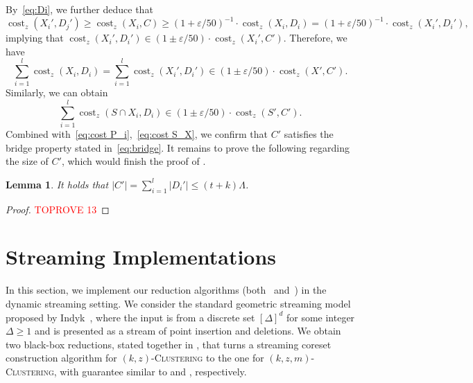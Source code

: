 \documentclass[letterpaper,11pt]{article}
\theoremstyle{plain}
\newtheorem{lemma}[theorem]{Lemma}
\theoremstyle{definition}
\theoremstyle{remark}
\DeclareMathOperator{\cost}{cost}
\newcommand{\eps}{\varepsilon}
\newcommand{\ProblemName}[1]{\textsc{#1}}
\newcommand{\kzC}{\ProblemName{$(k,z)$-Clustering}\xspace}
\newcommand{\kzmC}{\ProblemName{$(k,z,m)$-Clustering}\xspace}
\begin{document}
By~\eqref{eq:Di}, we further deduce that 
\begin{equation*}
\cost_z(X_i',D_j')\ge \cost_z(X_i,C)\ge (1+\eps/50)^{-1}\cdot \cost_z(X_i,D_i)= (1+\eps/50)^{-1}\cdot \cost_z(X_i',D_i'),
\end{equation*}
implying that $\cost_z(X_i',D_i')\in (1\pm\eps/50)\cdot \cost_z(X_i',C')$.
Therefore, we have 
\begin{equation*}
\sum_{i=1}^l\cost_z(X_i,D_i) = \sum_{i=1}^l\cost_z(X_i',D_i') \in (1\pm \eps/50)\cdot\cost_z(X',C').
\end{equation*}
Similarly, we can obtain 
\begin{equation*}
\sum_{i=1}^l\cost_z(S\cap X_i,D_i)\in (1\pm\eps/50)\cdot \cost_z(S',C').
\end{equation*}
Combined with~\eqref{eq:cost P_i},~\eqref{eq:cost S_X}, we confirm that $C'$ satisfies the bridge property stated in~\eqref{eq:bridge}. It remains to prove the following  regarding the size of $C'$, which would finish the proof of .
















\begin{lemma}
\label{claim:bounded C'}
It holds that
$|C'|=\sum_{i=1}^l |D_i'|\le (t+k)\Lambda$.
\end{lemma}
\begin{proof}\textcolor{red}{TOPROVE 13}\end{proof}
 


\section{Streaming Implementations}
\label{sec:streaming}

In this section, we implement our reduction algorithms (both~ and~) in the dynamic streaming setting. 
We consider the standard geometric streaming model proposed by Indyk~\cite{DBLP:conf/stoc/Indyk04},
where the input is from a discrete set $[\Delta]^d$ for some integer $\Delta \geq 1$ and is presented as a stream of point insertion and deletions.
We obtain two black-box reductions, stated together in , that turns a streaming coreset construction algorithm for \kzC to the one for \kzmC, with guarantee similar to  and , respectively. 
\end{document}
